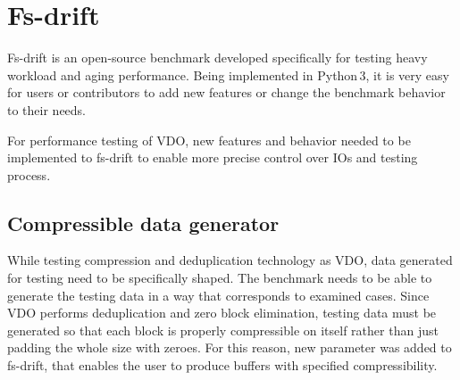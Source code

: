 \documentclass[
  color, %
  table, %
  lof,   %
  lot,   %
]{fithesis3}
\begin{document}




\chapter{Fs-drift}
\label{fs-drift}

Fs-drift is an open-source benchmark developed specifically for testing heavy workload and aging performance. Being implemented in Python\,3, it is very easy for users or contributors to add new features or change the benchmark behavior to their needs.

For performance testing of VDO, new features and behavior needed to be implemented to fs-drift to enable more precise control over IOs and testing process.

\section{Compressible data generator}
While testing compression and deduplication technology as VDO, data generated for testing need to be specifically shaped. The benchmark needs to be able to generate the testing data in a way that corresponds to examined cases. Since VDO performs deduplication and zero block elimination, testing data must be generated so that each block is properly compressible on itself rather than just padding the whole size with zeroes. For this reason, new parameter was added to fs-drift, that enables the user to produce buffers with specified compressibility.
\end{document}
